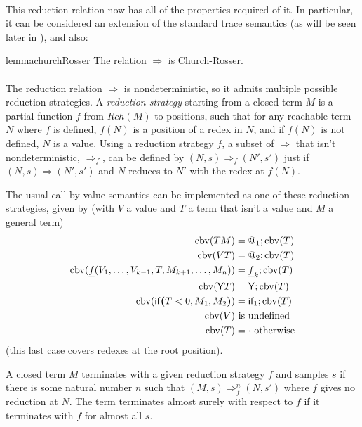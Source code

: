 \paragraph{}
This reduction relation now has all of the properties required of it. In particular, it can be considered an extension of the standard trace semantics (as will be seen later in ), and also:
\begin{restatable}{lemma}{churchRosser} \label{churchRosser}
The relation $\Rightarrow$ is Church-Rosser.
\end{restatable}

\paragraph{}
The reduction relation $\Rightarrow$ is nondeterministic, so it admits multiple possible reduction strategies. 
A \emph{reduction strategy} starting from a closed term $M$ is a partial function $f$ from $Rch(M)$ to positions, such that for any reachable term $N$ where $f$ is defined, $f(N)$ is a position of a redex in $N$, and if $f(N)$ is not defined, $N$ is a value.
Using a reduction strategy $f$, a subset of $\Rightarrow$ that isn't nondeterministic, $\Rightarrow_f$, can be defined by $(N,s) \Rightarrow_f (N',s')$ just if $(N,s) \Rightarrow (N',s')$ and $N$ reduces to $N'$ with the redex at $f(N)$.

The usual call-by-value semantics can be implemented as one of these reduction strategies, given by (with $V$ a value and $T$ a term that isn't a value and $M$ a general term)
\begin{align*}
\operatorname{cbv}(T M) & = @_1 ; \operatorname{cbv}(T) \\
\operatorname{cbv}(V T) & = @_2 ; \operatorname{cbv}(T) \\
\operatorname{cbv}(\underline f(V_1, \dots, V_{k-1}, T, M_{k+1}, \dots, M_n)) & = \underline f_k ; \operatorname{cbv}(T) \\
\operatorname{cbv}(\mathsf{Y} T) & = \mathsf{Y} ; \operatorname{cbv}(T) \\
\operatorname{cbv}(\mathsf{if}\boldsymbol{(}T < 0, M_1, M_2\boldsymbol{)}) & = \textsf{if}_1 ; \operatorname{cbv}(T) \\
\operatorname{cbv}(V) & \text{ is undefined} \\
\operatorname{cbv}(T) & = \cdot \text{ otherwise}
\end{align*}
(this last case covers redexes at the root position).

A closed term $M$ terminates with a given reduction strategy $f$ and samples $s$ if there is some natural number $n$ such that $(M,s) \Rightarrow_f^n (N,s')$ where $f$ gives no reduction at $N$. The term terminates almost surely with respect to $f$ if it terminates with $f$ for almost all $s$.

